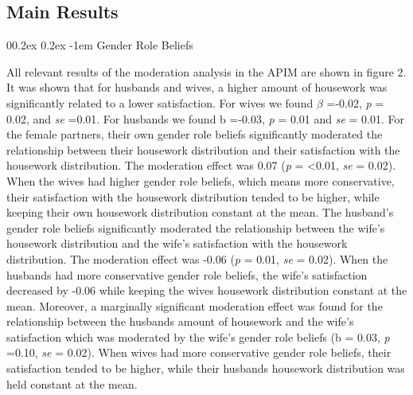 \documentclass[
  man,floatsintext]{apa6}
\makeatletter
\let\oldparagraph\paragraph
\renewcommand{\paragraph}[1]{\oldparagraph{#1}\mbox{}}
\renewcommand{\paragraph}{\@startsection{paragraph}{4}{\parindent}%
  {0\baselineskip \@plus 0.2ex \@minus 0.2ex}%
  {-1em}%
  {\normalfont\normalsize\bfseries\itshape\typesectitle}}
\makeatother
\begin{document}
\hypertarget{main-results}{%
\subsection{Main Results}\label{main-results}}

\hypertarget{gender-role-beliefs}{%
\paragraph{Gender Role Beliefs}\label{gender-role-beliefs}}

All relevant results of the moderation analysis in the APIM are shown in figure 2. It was shown that for husbands and wives, a higher amount of housework was significantly related to a lower satisfaction. For wives we found \(\beta\) =-0.02, \emph{p} = 0.02, and \emph{se} =0.01. For husbands we found b =-0.03, \emph{p} = 0.01 and \emph{se} = 0.01.
For the female partners, their own gender role beliefs significantly moderated the relationship between their housework distribution and their satisfaction with the housework distribution. The moderation effect was 0.07 (\emph{p} = \textless0.01, \emph{se} = 0.02). When the wives had higher gender role beliefs, which means more conservative, their satisfaction with the housework distribution tended to be higher, while keeping their own housework distribution constant at the mean. The husband's gender role beliefs significantly moderated the relationship between the wife's housework distribution and the wife's satisfaction with the housework distribution. The moderation effect was -0.06 (\emph{p} = 0.01, \emph{se} = 0.02). When the husbands had more conservative gender role beliefs, the wife's satisfaction decreased by -0.06 while keeping the wives housework distribution constant at the mean. Moreover, a marginally significant moderation effect was found for the relationship between the husbands amount of housework and the wife's satisfaction which was moderated by the wife's gender role beliefs (b = 0.03, \emph{p} =0.10, \emph{se} = 0.02). When wives had more conservative gender role beliefs, their satisfaction tended to be higher, while their husbands housework distribution was held constant at the mean.
\end{document}

